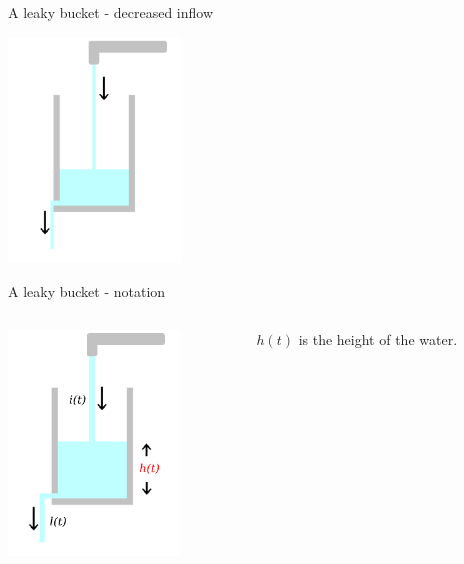 \documentclass{beamer}
\newcommand{\cred}{\color{red}}
\begin{document}
\begin{frame}{A leaky bucket - decreased inflow}

  \begin{center}
    \includegraphics[height=6cm]{glass_level_down.png}
  \end{center}
  
\end{frame}


\begin{frame}{A leaky bucket - notation}
\begin{columns}
\begin{column}{0.5\textwidth}
  \begin{center}
     \includegraphics[height=6cm]{glass_h_red.png}      
     \end{center}
\end{column}
\begin{column}{0.5\textwidth}
\cred{} $h(t)$\color{black}{} is the height of the water.
\end{column}
\end{columns}
\end{frame}
\end{document}
